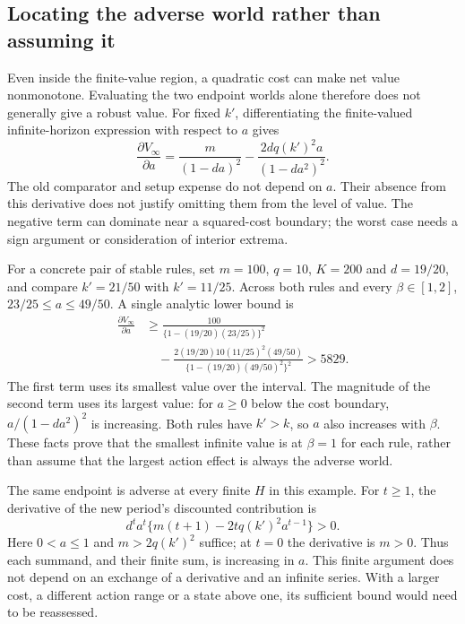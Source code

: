 \subsection{Locating the adverse world rather than assuming it}
\label{exec17:s6-rule-value}

Even inside the finite-value region, a quadratic cost can make net value
nonmonotone. Evaluating the two endpoint worlds alone therefore does not
generally give a robust value. For fixed $k'$, differentiating the
finite-valued infinite-horizon expression with respect to $a$ gives
\begin{equation}
 \frac{\partial V_\infty}{\partial a}
  =\frac{m}{(1-da)^2}
   -\frac{2dq(k')^2a}{(1-da^2)^2}.
 \label{exec17:s6-full-derivative}
\end{equation}
The old comparator and setup expense do not depend on $a$. Their absence
from this derivative does not justify omitting them from the level of
value. The negative term can dominate near a squared-cost boundary;
the worst case needs a sign argument or consideration of interior extrema.

For a concrete pair of stable rules, set $m=100$, $q=10$, $K=200$ and
$d=19/20$, and compare $k'=21/50$ with $k'=11/25$. Across both rules
and every $\beta\in[1,2]$, $23/25\leq a\leq49/50$. A single analytic
lower bound is
\begin{equation}
 \begin{split}
 \frac{\partial V_\infty}{\partial a}
 &\geq\frac{100}{\{1-(19/20)(23/25)\}^2}\\
 &\quad-\frac{2(19/20)10(11/25)^2(49/50)}
                   {\{1-(19/20)(49/50)^2\}^2}
 >5829.
 \end{split}
 \label{exec17:s6-controller-monotone}
\end{equation}
The first term uses its smallest value over the interval. The magnitude
of the second term uses its largest value: for $a\geq0$ below the
cost boundary, $a/(1-da^2)^2$ is increasing. Both rules have $k'>k$,
so $a$ also increases with $\beta$. These facts prove that the smallest
infinite value is at $\beta=1$ for each rule, rather than assume that
the largest action effect is always the adverse world.

The same endpoint is adverse at every finite $H$ in this example. For
$t\geq1$, the derivative of the new period's discounted contribution is
\begin{equation}
 d^t a^t\{m(t+1)-2tq(k')^2a^{t-1}\}>0.
 \label{exec17:s6-finite-monotone}
\end{equation}
Here $0<a\leq1$ and $m>2q(k')^2$ suffice; at $t=0$ the derivative
is $m>0$. Thus each summand, and their finite sum, is increasing in
$a$. This finite argument does not depend on an exchange of a derivative
and an infinite series. With a larger cost, a different action range or
a state above one, its sufficient bound would need to be reassessed.

